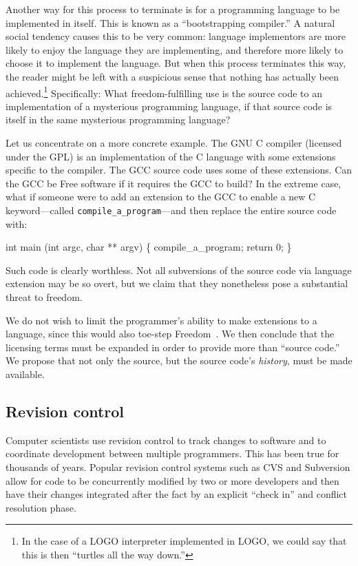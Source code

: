 \documentclass[twocolumn]{article}
\begin{document}
Another way for this process to terminate is for a programming
language to be implemented in itself. This is known as a
``bootstrapping compiler.'' A natural social tendency causes this to
be very common: language implementors are more likely to enjoy the
language they are implementing, and therefore more likely to choose it
to implement the language. But when this process terminates this way,
the reader might be left with a suspicious sense that nothing has
actually been achieved.\z\footnote{In the case of a LOGO interpreter
implemented in LOGO, we could say that this is then ``turtles all the
way down.''} Specifically: What freedom-fulfilling use is the source
code to an implementation of a mysterious programming language, if
that source code is itself in the same mysterious programming
language?

Let us concentrate on a more concrete example. The GNU C
compiler (licensed under the GPL) is
an implementation of the C language with some extensions specific to
the compiler. The GCC source code uses some of these extensions. Can
the GCC be Free software if it requires the GCC to build? In the
extreme case, what if someone were to add an extension to the GCC to
enable a new C keyword---called {\tt compile\_a\_program}---and then
replace the entire source code with:

\begin{code}
int main (int argc, char ** argv) \{
  compile_a_program;
  return 0;
\}
\end{code}

Such code is clearly worthless. Not all subversions of the source code
via language extension may be so overt, but we claim that they
nonetheless pose a substantial threat to freedom.

We do not wish to limit the programmer's ability to make extensions to
a language, since this would also toe-step Freedom~\ftinker. We then
conclude that the licensing terms must be expanded in order to provide
more than ``source code.'' We propose that not only the source, but
the source code's {\em history}, must be made available.

\subsection{Revision control}

Computer scientists use revision control to
track changes to software and to coordinate development between
multiple programmers. This has been true for thousands of years.
Popular revision control systems such as CVS and Subversion allow for code
to be concurrently modified by two or more developers and then have
their changes integrated after the fact by an explicit ``check in''
and conflict resolution phase.
\end{document}
